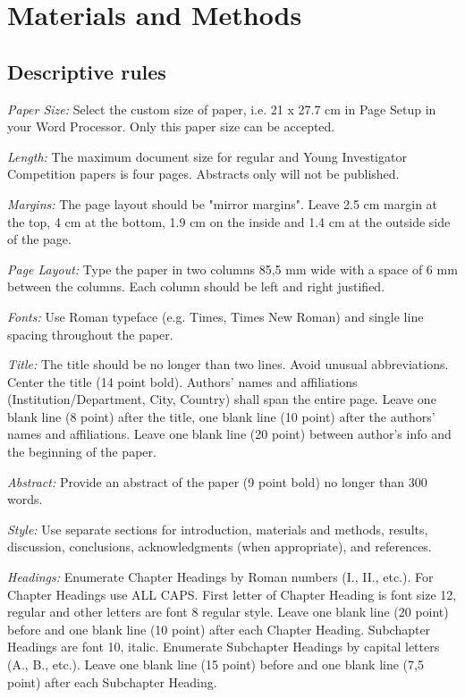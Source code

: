 \section{Materials and Methods}

\subsection{Descriptive rules}

\textit{Paper Size:} Select the custom size of paper, i.e. 21 x 27.7 cm
in Page Setup in your Word Processor. Only this paper size can be
accepted.

\textit{Length:} The maximum document size for regular and Young
Investigator Competition papers is four pages. Abstracts only will not
be published.

\textit{Margins:} The page layout should be "mirror margins". Leave 2.5
cm margin at the top, 4 cm at the bottom, 1.9 cm on the inside and 1.4
cm at the outside side of the page.

\textit{Page Layout:} Type the paper in two columns 85,5 mm wide with a
space of 6 mm between the columns. Each column should be left and right
justified.

\textit{Fonts:} Use Roman typeface (e.g. Times, Times New Roman) and
single line spacing throughout the paper.

\textit{Title:} The title should be no longer than two lines. Avoid
unusual abbreviations. Center the title (14 point bold). Authors' names
and affiliations (Institution/Department, City, Country) shall span the
entire page. Leave one blank line (8 point) after the title, one blank
line (10 point) after the authors' names and affiliations. Leave one
blank line (20 point) between author's info and the beginning of the
paper.

\textit{Abstract:} Provide an abstract of the paper (9 point bold) no
longer than 300 words.

\textit{Style:} Use separate sections for introduction, materials and
methods, results, discussion, conclusions, acknowledgments (when
appropriate), and references.

\textit{Headings:} Enumerate Chapter Headings by Roman numbers (I., II.,
etc.). For Chapter Headings use ALL CAPS. First letter of Chapter
Heading is font size 12, regular and other letters are font 8 regular
style. Leave one blank line (20 point) before and one blank line (10
point) after each Chapter Heading. Subchapter Headings are font 10,
italic. Enumerate Subchapter Headings by capital letters (A., B., etc.).
Leave one blank line (15 point) before and one blank line (7,5 point)
after each Subchapter Heading.

